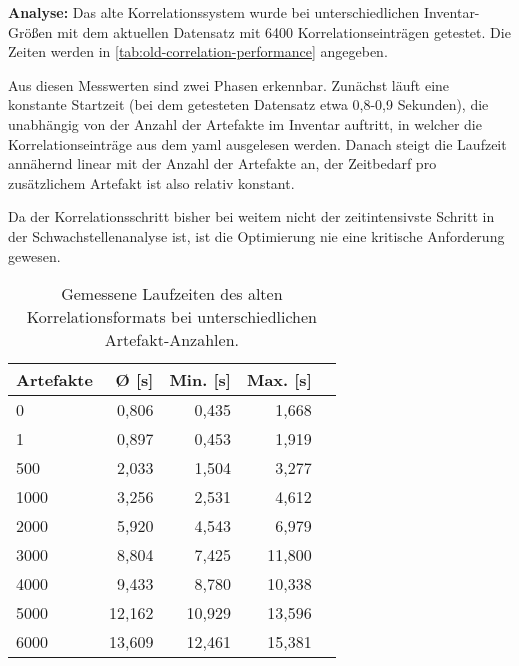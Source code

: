 \textbf{Analyse:}
Das alte Korrelationssystem wurde bei unterschiedlichen Inventar-Größen mit dem aktuellen Datensatz mit 6400 Korrelationseinträgen getestet.
Die Zeiten werden in \autoref{tab:old-correlation-performance} angegeben.

Aus diesen Messwerten sind zwei Phasen erkennbar.
Zunächst läuft eine konstante Startzeit (bei dem getesteten Datensatz etwa 0,8-0,9 Sekunden), die unabhängig von der Anzahl der Artefakte im Inventar auftritt, in welcher die Korrelationseinträge aus dem \acrshort{yaml} ausgelesen werden.
Danach steigt die Laufzeit annähernd linear mit der Anzahl der Artefakte an, der Zeitbedarf pro zusätzlichem Artefakt ist also relativ konstant.

Da der Korrelationsschritt bisher bei weitem nicht der zeitintensivste Schritt in der Schwachstellenanalyse ist, ist die Optimierung nie eine kritische Anforderung gewesen.

\begin{table}[h!]
    \centering
    \begin{tabular}{l r r r r}
        \toprule
        \textbf{Artefakte} & \textbf{Ø [s]} & \textbf{Min. [s]} & \textbf{Max. [s]} \\
        \midrule
        0                  & 0,806          & 0,435             & 1,668             \\
        1                  & 0,897          & 0,453             & 1,919             \\
        500                & 2,033          & 1,504             & 3,277             \\
        1000               & 3,256          & 2,531             & 4,612             \\
        2000               & 5,920          & 4,543             & 6,979             \\
        3000               & 8,804          & 7,425             & 11,800            \\
        4000               & 9,433          & 8,780             & 10,338            \\
        5000               & 12,162         & 10,929            & 13,596            \\
        6000               & 13,609         & 12,461            & 15,381            \\
        \bottomrule
    \end{tabular}
    \caption{Gemessene Laufzeiten des alten Korrelationsformats bei unterschiedlichen Artefakt-Anzahlen.}
    \label{tab:old-correlation-performance}
\end{table}

